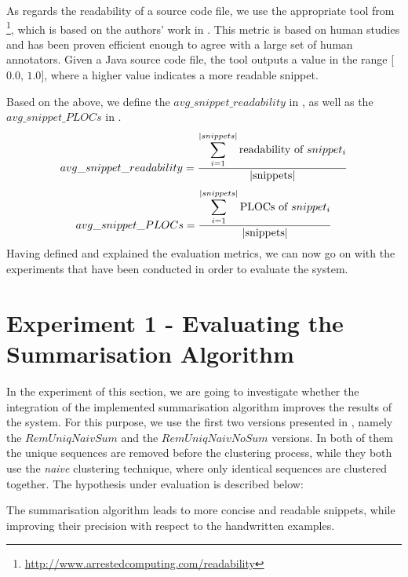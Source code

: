 As regards the readability of a source code file, we use the appropriate tool from \footnote{\url{http://www.arrestedcomputing.com/readability}}, which is based on the authors' work in \cite{Buse:2008}. This metric is based on human studies and has been proven efficient enough to agree with a large set of human annotators. Given a Java source code file, the tool outputs a value in the range [$0.0$, $1.0$], where a higher value indicates a more readable snippet.

Based on the above, we define the $avg\_snippet\_readability$ in , as well as the $avg\_snippet\_PLOCs$ in .
\vspace{1.5ex}
%
\begin{equation}
 \label{eq:readability}
 \centering
  avg\_snippet\_readability = 
  \frac{ \displaystyle\sum_{i=1}^{|snippets|}\text{readability of $snippet_i$} }
       { | \text{snippets} | }
\end{equation}
\vspace{-1ex}
%
\begin{equation}
 \label{eq:plocs}
 \centering
  avg\_snippet\_PLOCs = 
  \frac{ \displaystyle\sum_{i=1}^{|snippets|}\text{PLOCs of $snippet_i$} }
       { | \text{snippets} | }
  \vspace{1.5ex}
\end{equation}
%
Having defined and explained the evaluation metrics, we can now go on with the experiments that have been conducted in order to evaluate the system.


\section{Experiment 1 - Evaluating the Summarisation Algorithm}
\label{sec:evaluation-exp1}

In the experiment of this section, we are going to investigate whether the integration of the implemented summarisation algorithm improves the results of the system. For this purpose, we use the first two versions presented in , namely the $RemUniqNaivSum$ and the $RemUniqNaivNoSum$ versions. In both of them the unique sequences are removed before the clustering process, while they both use the \textit{naive} clustering technique, where only identical sequences are clustered together. The hypothesis under evaluation is described below:

\begin{hypothesis}
The summarisation algorithm leads to more concise and readable snippets, while improving their precision with respect to the handwritten examples.
\end{hypothesis}


